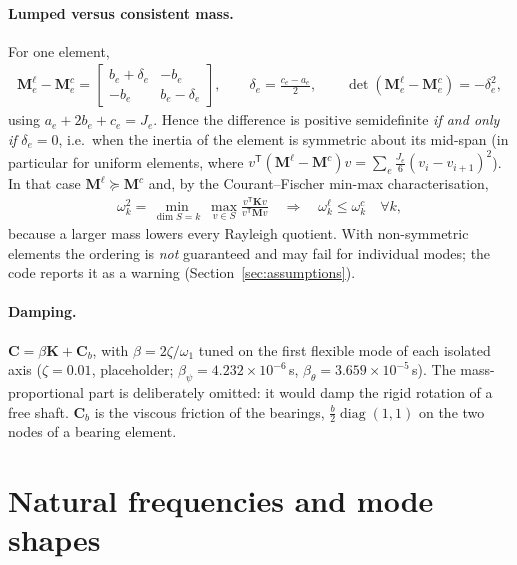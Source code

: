 \documentclass[10pt,a4paper]{article}
\numberwithin{equation}{section}
\begin{document}
\paragraph{Lumped versus consistent mass.} For one element,
\begin{gather}
\mathbf M_e^{\ell} - \mathbf M_e^{c} = \begin{bmatrix} b_e + \delta_e & -b_e \\ -b_e & b_e - \delta_e\end{bmatrix}, \qquad \delta_e = \frac{c_e - a_e}{2}, \qquad
\det\left(\mathbf M_e^{\ell} - \mathbf M_e^{c}\right) = -\delta_e^2 ,
\end{gather}
using $a_e + 2b_e + c_e = J_e$. Hence the difference is positive semidefinite \emph{if and only if} $\delta_e = 0$, i.e.\ when the inertia of the element is symmetric about its mid-span (in particular for uniform elements, where $v^{\mathsf T}(\mathbf M^{\ell}-\mathbf M^{c})v = \sum_e \frac{J_e}{6}(v_i - v_{i+1})^2$). In that case $\mathbf M^{\ell}\succeq\mathbf M^{c}$ and, by the Courant--Fischer min-max characterisation,
\begin{gather}
\omega_k^2 = \min_{\dim S = k}\ \max_{v\in S}\frac{v^{\mathsf T}\mathbf K v}{v^{\mathsf T}\mathbf M v}\quad\Longrightarrow\quad \omega_k^{\ell} \le \omega_k^{c}\quad\forall k,
\end{gather}
because a larger mass lowers every Rayleigh quotient. With non-symmetric elements the ordering is \emph{not} guaranteed and may fail for individual modes; the code reports it as a warning (Section~\ref{sec:assumptions}).
\paragraph{Damping.} $\mathbf C = \beta\mathbf K + \mathbf C_b$, with $\beta = 2\zeta/\omega_1$ tuned on the first flexible mode of each isolated axis ($\zeta = 0.01$, placeholder; $\beta_\psi = 4.232\times10^{-6}$\,s, $\beta_\theta = 3.659\times10^{-5}$\,s). The mass-proportional part is deliberately omitted: it would damp the rigid rotation of a free shaft. $\mathbf C_b$ is the viscous friction of the bearings, $\frac{b}{2}\operatorname{diag}(1,1)$ on the two nodes of a bearing element.
\section{Natural frequencies and mode shapes}\label{sec:eigen}
\end{document}
